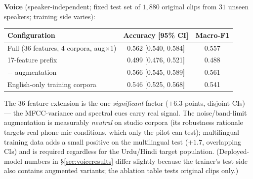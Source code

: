 \documentclass[11pt,a4paper]{article}
\begin{document}
\textbf{Voice} (speaker-independent; fixed test set of $1{,}880$ original clips from
$31$ unseen speakers; training side varies):
\begin{center}
\begin{tabular}{lcc}
\toprule
\textbf{Configuration} & \textbf{Accuracy [95\% CI]} & \textbf{Macro-F1} \\
\midrule
Full (36 features, 4 corpora, aug$\times$1) & 0.562 [0.540, 0.584] & 0.557 \\
17-feature prefix                           & 0.499 [0.476, 0.521] & 0.488 \\
$-$ augmentation                            & 0.566 [0.545, 0.589] & 0.561 \\
English-only training corpora               & 0.546 [0.525, 0.568] & 0.541 \\
\bottomrule
\end{tabular}
\end{center}
The 36-feature extension is the one \emph{significant} factor ($+6.3$ points,
disjoint CIs) --- the MFCC-variance and spectral cues carry real signal. The
noise/band-limit augmentation is measurably \emph{neutral} on studio corpora (its
robustness rationale targets real phone-mic conditions, which only the pilot can
test); multilingual training data adds a small positive on the multilingual test
($+1.7$, overlapping CIs) and is required regardless for the Urdu/Hindi target
population. (Deployed-model numbers in \S\ref{sec:voiceresults} differ slightly
because the trainer's test side also contains augmented variants; the ablation table
tests original clips only.)
\end{document}
